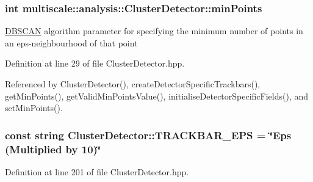 \hypertarget{classmultiscale_1_1analysis_1_1ClusterDetector_aa94df1adc462be5931ec25ba24122fe9}{
\subsubsection[{min\-Points}]{\setlength{\rightskip}{0pt plus 5cm}int {\bf multiscale\-::analysis\-::\-Cluster\-Detector\-::min\-Points}}}\label{classmultiscale_1_1analysis_1_1ClusterDetector_aa94df1adc462be5931ec25ba24122fe9}
\hyperlink{classmultiscale_1_1analysis_1_1DBSCAN}{\-D\-B\-S\-C\-A\-N} algorithm parameter for specifying the minimum number of points in an eps-\/neighbourhood of that point 

\-Definition at line 29 of file \-Cluster\-Detector.\-hpp.



\-Referenced by \-Cluster\-Detector(), create\-Detector\-Specific\-Trackbars(), get\-Min\-Points(), get\-Valid\-Min\-Points\-Value(), initialise\-Detector\-Specific\-Fields(), and set\-Min\-Points().

\hypertarget{classmultiscale_1_1analysis_1_1ClusterDetector_a656f64f88c73c25824e5a4416a742aaf}{
\subsubsection[{\-T\-R\-A\-C\-K\-B\-A\-R\-\_\-\-E\-P\-S}]{\setlength{\rightskip}{0pt plus 5cm}const string {\bf \-Cluster\-Detector\-::\-T\-R\-A\-C\-K\-B\-A\-R\-\_\-\-E\-P\-S} = \char`\"{}\-Eps (\-Multiplied by 10)\char`\"{}}}\label{classmultiscale_1_1analysis_1_1ClusterDetector_a656f64f88c73c25824e5a4416a742aaf}


\-Definition at line 201 of file \-Cluster\-Detector.\-hpp.



